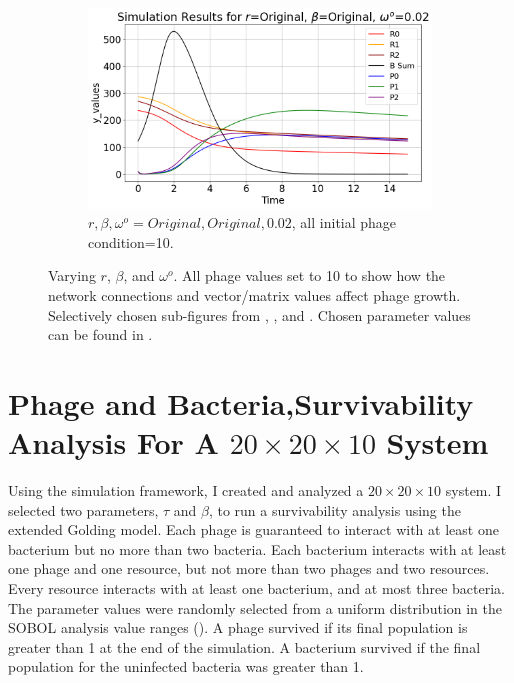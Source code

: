 \begin{figure}[]
\begin{subfigure}{0.32\linewidth}
        \includegraphics[width=\linewidth]{Images/Plots/Created/UA/r_beta_washout_Original_Original_0.02.png}
        \caption{
            $r, \beta, \omega^o = Original, Original, 0.02$, all initial phage condition=10. 
        }
        \label{fig:created:r_beta_washout_original_original_0.02}
    \end{subfigure}
    \caption{
        Varying $r$, $\beta$, and $\omega^o$. 
        All phage values set to 10 to show how the network connections and vector/matrix values affect phage growth. 
        Selectively chosen sub-figures from , , and . 
        Chosen parameter values can be found in . 
    }
    \label{fig:created:r_beta_washout}
\end{figure}

\section{Phage and Bacteria,Survivability Analysis For A $20\times20\times10$ System}
Using the simulation framework, I created and analyzed a $20\times20\times10$ system. 
I selected two parameters, $\tau$ and $\beta$, to run a survivability analysis using the extended Golding model. 
Each phage is guaranteed to interact with at least one bacterium but no more than two bacteria. 
Each bacterium interacts with at least one phage and one resource, but not more than two phages and two resources. 
Every resource interacts with at least one bacterium, and at most three bacteria. 
The parameter values were randomly selected from a uniform distribution in the SOBOL analysis value ranges (). 
A phage survived if its final population is greater than 1 at the end of the simulation. 
A bacterium survived if the final population for the uninfected bacteria was greater than 1. 

